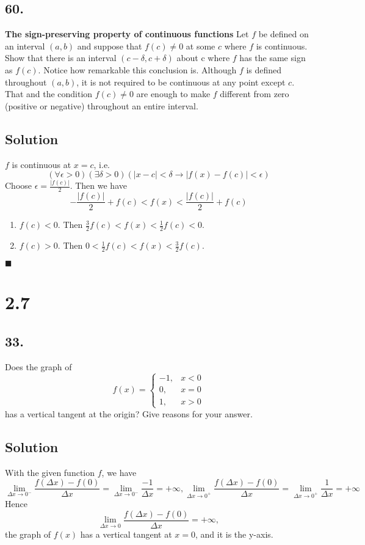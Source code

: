 \documentclass{article}
\begin{document}
\subsection*{60.}
\textbf{The sign-preserving property of continuous functions} Let $f$ be defined on an interval $(a,b)$ and suppose that $f(c)\neq 0$ at some $c$ where $f$ is continuous. Show that there is an interval $(c-\delta,c+\delta)$ about c where $f$ has the same sign as $f(c)$. Notice how remarkable this conclusion is. Although $f$ is defined throughout $(a,b)$, it is not required to be continuous at any point except $c$. That and the condition $f(c)\neq 0$ are enough to make $f$ different from zero (positive or negative) throughout an entire interval.
\subsection*{Solution}
$f$ is continuous at $x=c$, i.e. 
\[(\forall \epsilon>0)(\exists \delta>0)(|x-c|<\delta \rightarrow |f(x)-f(c)|<\epsilon )\]
Choose $\epsilon=\frac{|f(c)|}{2}$. Then we have 
\[-\frac{|f(c)|}{2}+f(c)<f(x)<\frac{|f(c)|}{2}+f(c)\]
\begin{enumerate}
    \item $f(c)<0$. Then $\frac{3}{2}f(c)<f(x)<\frac{1}{2}f(c)<0$.
    \item $f(c)>0$. Then $0<\frac{1}{2}f(c)<f(x)<\frac{3}{2}f(c)$.
\end{enumerate}
$\blacksquare$
\section*{2.7}
\subsection*{33.}
Does the graph of 
\[f(x)=\left\{\begin{array}{rr}
-1, & x<0\\
0, & x=0\\
1,&x>0
\end{array}\right.\]
has a vertical tangent at the origin? Give reasons for your answer.
\subsection*{Solution}
With the given function $f$, we have
\[\lim _{\Delta x\to 0^-} \frac{f(\Delta x)-f(0)}{\Delta x}=\lim _{\Delta x\to 0^-} \frac{-1}{\Delta x}=+\infty,\lim _{\Delta x\to 0^+} \frac{f(\Delta x)-f(0)}{\Delta x}=\lim _{\Delta x\to 0^+} \frac{1}{\Delta x}=+\infty\]
Hence 
\[\lim _{\Delta x\to 0} \frac{f(\Delta x)-f(0)}{\Delta x}=+\infty,\]
the graph of $f(x)$ has a vertical tangent at $x=0$, and it is the y-axis.
\end{document}

